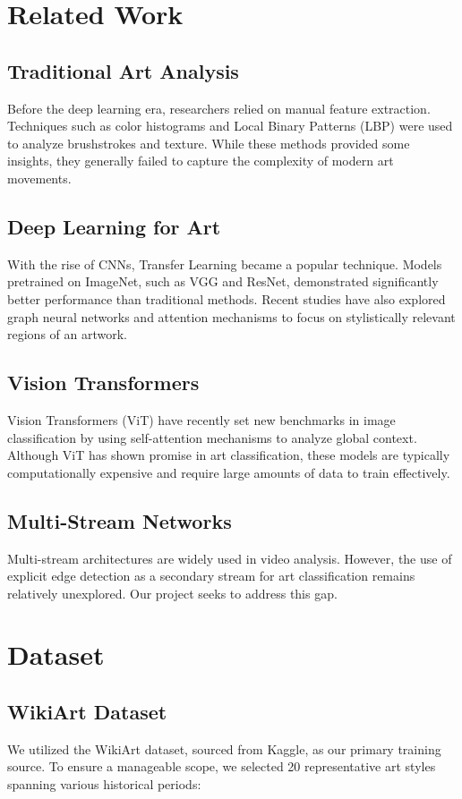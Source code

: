 \documentclass[conference]{IEEEtran}
\begin{document}
\section{Related Work}

\subsection{Traditional Art Analysis}
Before the deep learning era, researchers relied on manual feature extraction. Techniques such as color histograms and Local Binary Patterns (LBP) were used to analyze brushstrokes and texture. While these methods provided some insights, they generally failed to capture the complexity of modern art movements.

\subsection{Deep Learning for Art}
With the rise of CNNs, Transfer Learning became a popular technique. Models pretrained on ImageNet, such as VGG and ResNet, demonstrated significantly better performance than traditional methods. Recent studies have also explored graph neural networks and attention mechanisms to focus on stylistically relevant regions of an artwork.

\subsection{Vision Transformers}
Vision Transformers (ViT) have recently set new benchmarks in image classification by using self-attention mechanisms to analyze global context. Although ViT has shown promise in art classification, these models are typically computationally expensive and require large amounts of data to train effectively.

\subsection{Multi-Stream Networks}
Multi-stream architectures are widely used in video analysis. However, the use of explicit edge detection as a secondary stream for art classification remains relatively unexplored. Our project seeks to address this gap.

\section{Dataset}

\subsection{WikiArt Dataset}
We utilized the WikiArt dataset, sourced from Kaggle, as our primary training source. To ensure a manageable scope, we selected 20 representative art styles spanning various historical periods:
\end{document}
